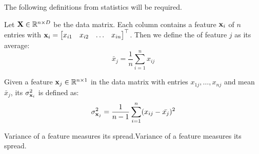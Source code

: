 \documentclass[a4paper]{article}
\begin{document}
The following definitions from statistics will be required.
\begin{definition} Let $\textbf{X} \in \mathbb{R}^{n \times D}$ be the data matrix. Each column contains a feature $\textbf{x}_i$ of $n$ entries with $\textbf{x}_{i}  = \begin{bmatrix}x_{i1} & x_{i2} & \ldots & x_{in}\end{bmatrix}^{\top}$. Then we define the  of feature $j$ as its average: 
\begin{equation}
    \bar{x}_j = \frac{1}{n}\sum\limits_{i=1}^{n}x_{ij}
    \label{eq:def_mean_vector}
\end{equation}
\end{definition}
\begin{definition}[variance]
Given a feature $\textbf{x}_j \in \mathbb{R}^{n\times 1}$ in the data matrix with entries $x_{1j},\ldots,x_{nj}$ and mean $\bar{x}_j$, its  $\sigma_{\textbf{x}_i}^2$ is defined as:
\begin{equation}
   \sigma_{\textbf{x}_j}^2 = \frac{1}{n-1}\sum\limits_{i=1}^{n} (x_{ij} - \bar{x_j})^2
\end{equation}
\end{definition}
Variance of a feature measures its spread.Variance of a feature measures its spread.
\end{document}
